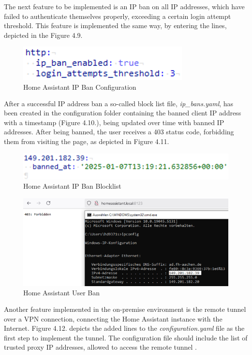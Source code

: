 The next feature to be implemented is an IP ban on all IP addresses, which have failed to authenticate themselves properly, exceeding a certain login attempt threshold. This feature is implemented the same way, by entering the lines, depicted in the Figure 4.9.
\begin{figure}[H]
	\centering
	\includegraphics[width=0.5 \linewidth]{Images/K4/Picture12.png}
	\caption{Home Assistant IP Ban Configuration}
	\label{fig:Rpi_ban}
\end{figure}

After a successful IP address ban a so-called block list file, \textit{ip\_bans.yaml}, has been created in the configuration folder containing the banned client IP address with a timestamp (Figure 4.10.), being updated over time with banned IP addresses. After being banned, the user receives a 403 status code, forbidding them from visiting the page, as depicted in Figure 4.11.
\begin{figure}[H]
	\centering
	\includegraphics[width=0.6 \linewidth]{Images/K4/Picture13.png}
	\caption{Home Assistant IP Ban Blocklist}
	\label{fig:ha_blocklist}
\end{figure}
\begin{figure}[H]
	\centering
	\includegraphics[width=0.7 \linewidth]{Images/K4/Picture14.png}
	\caption{Home Assistant User Ban}
	\label{fig:ha_ban}
\end{figure}

Another feature implemented in the on-premise environment is the remote tunnel over a VPN connection, connecting the Home Assistant instance with the Internet. Figure 4.12. depicts the added lines to the \textit{configuration.yaml} file as the first step to implement the tunnel. The configuration file should include the list of trusted proxy IP addresses, allowed to access the remote tunnel \cite{ha_proxies}. 

